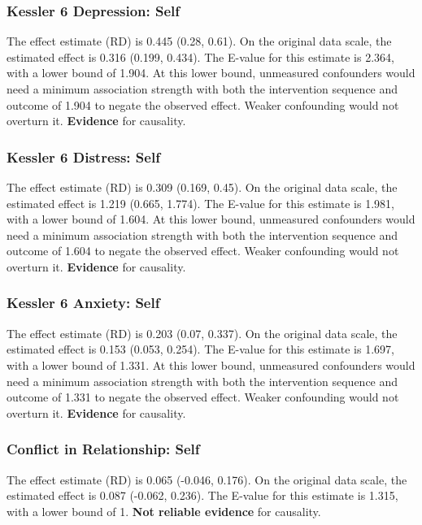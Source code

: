 \documentclass[
  singlecolumn]{article}
\begin{document}
\subsubsection{Kessler 6 Depression:
Self}\label{kessler-6-depression-self-15}

The effect estimate (RD) is 0.445 (0.28, 0.61). On the original data
scale, the estimated effect is 0.316 (0.199, 0.434). The E-value for
this estimate is 2.364, with a lower bound of 1.904. At this lower
bound, unmeasured confounders would need a minimum association strength
with both the intervention sequence and outcome of 1.904 to negate the
observed effect. Weaker confounding would not overturn it.
\textbf{Evidence} for causality.

\subsubsection{Kessler 6 Distress:
Self}\label{kessler-6-distress-self-15}

The effect estimate (RD) is 0.309 (0.169, 0.45). On the original data
scale, the estimated effect is 1.219 (0.665, 1.774). The E-value for
this estimate is 1.981, with a lower bound of 1.604. At this lower
bound, unmeasured confounders would need a minimum association strength
with both the intervention sequence and outcome of 1.604 to negate the
observed effect. Weaker confounding would not overturn it.
\textbf{Evidence} for causality.

\subsubsection{Kessler 6 Anxiety: Self}\label{kessler-6-anxiety-self-15}

The effect estimate (RD) is 0.203 (0.07, 0.337). On the original data
scale, the estimated effect is 0.153 (0.053, 0.254). The E-value for
this estimate is 1.697, with a lower bound of 1.331. At this lower
bound, unmeasured confounders would need a minimum association strength
with both the intervention sequence and outcome of 1.331 to negate the
observed effect. Weaker confounding would not overturn it.
\textbf{Evidence} for causality.

\subsubsection{Conflict in Relationship:
Self}\label{conflict-in-relationship-self-15}

The effect estimate (RD) is 0.065 (-0.046, 0.176). On the original data
scale, the estimated effect is 0.087 (-0.062, 0.236). The E-value for
this estimate is 1.315, with a lower bound of 1. \textbf{Not reliable
evidence} for causality.
\end{document}
